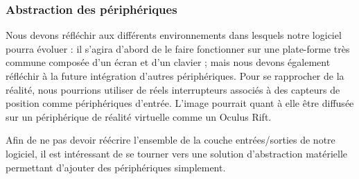 \subsubsection{Abstraction des périphériques}

Nous devons réfléchir aux différents environnements dans lesquels notre logiciel pourra évoluer : il s'agira d'abord de le faire fonctionner sur une plate-forme très commune composée d'un écran et d'un clavier ; mais nous devons également réfléchir à la future intégration d'autres périphériques. Pour se rapprocher de la réalité, nous pourrions utiliser de réels interrupteurs associés à des capteurs de position comme périphériques d'entrée. L'image pourrait quant à elle être diffusée sur un périphérique de réalité virtuelle comme un Oculus Rift.

Afin de ne pas devoir réécrire l'ensemble de la couche entrées/sorties de notre logiciel, il est intéressant de se tourner vers une solution d'abstraction matérielle permettant d'ajouter des périphériques simplement.
